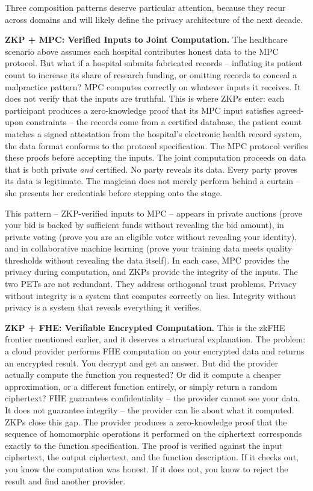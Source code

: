 \documentclass[
  11pt,
  openany]{report}
\renewcommand{\textbf}[1]{{\bfseries\color{MidnightBold}#1}}
\begin{document}
Three composition patterns deserve particular attention, because they recur
across domains and will likely define the privacy architecture of the next
decade.

\textbf{ZKP + MPC: Verified Inputs to Joint Computation.} The healthcare
scenario above assumes each hospital contributes honest data to the MPC
protocol. But what if a hospital submits fabricated records -- inflating its
patient count to increase its share of research funding, or omitting records to
conceal a malpractice pattern? MPC computes correctly on whatever inputs it
receives. It does not verify that the inputs are truthful. This is where ZKPs
enter: each participant produces a zero-knowledge proof that its MPC input
satisfies agreed-upon constraints -- the records come from a certified database,
the patient count matches a signed attestation from the hospital's electronic
health record system, the data format conforms to the protocol specification.
The MPC protocol verifies these proofs before accepting the inputs. The joint
computation proceeds on data that is both private \emph{and} certified. No party
reveals its data. Every party proves its data is legitimate. The magician does
not merely perform behind a curtain -- she presents her credentials before
stepping onto the stage.

This pattern -- ZKP-verified inputs to MPC -- appears in private auctions (prove
your bid is backed by sufficient funds without revealing the bid amount), in
private voting (prove you are an eligible voter without revealing your
identity), and in collaborative machine learning (prove your training data meets
quality thresholds without revealing the data itself). In each case, MPC
provides the privacy during computation, and ZKPs provide the integrity of the
inputs. The two PETs are not redundant. They address orthogonal trust problems.
Privacy without integrity is a system that computes correctly on lies. Integrity
without privacy is a system that reveals everything it verifies.

\textbf{ZKP + FHE: Verifiable Encrypted Computation.} This is the zkFHE frontier
mentioned earlier, and it deserves a structural explanation. The problem: a
cloud provider performs FHE computation on your encrypted data and returns an
encrypted result. You decrypt and get an answer. But did the provider actually
compute the function you requested? Or did it compute a cheaper approximation,
or a different function entirely, or simply return a random ciphertext? FHE
guarantees confidentiality -- the provider cannot see your data. It does not
guarantee integrity -- the provider can lie about what it computed. ZKPs close
this gap. The provider produces a zero-knowledge proof that the sequence of
homomorphic operations it performed on the ciphertext corresponds exactly to the
function specification. The proof is verified against the input ciphertext, the
output ciphertext, and the function description. If it checks out, you know the
computation was honest. If it does not, you know to reject the result and find
another provider.
\end{document}
